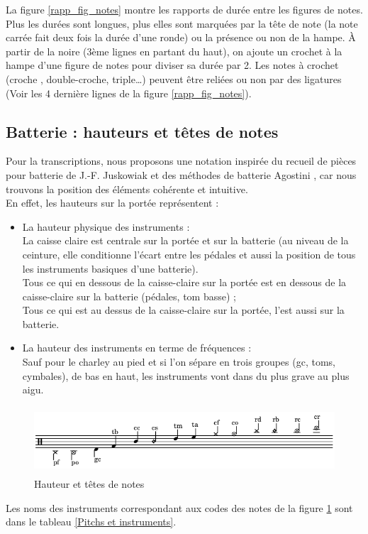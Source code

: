 La figure \ref{rapp_fig_notes} montre les rapports de durée entre les figures de notes. Plus les durées sont longues, plus elles sont marquées par la tête de note (la note carrée fait deux fois la durée d’une ronde) ou la présence ou non de la hampe. À partir de la noire (3ème lignes en partant du haut), on ajoute un crochet à la hampe d’une figure de notes pour diviser sa durée par 2. Les notes à crochet (croche , double-croche, triple…) peuvent être reliées ou non par des ligatures (Voir les 4 dernière lignes de la figure \ref{rapp_fig_notes}).
\subsection*{Batterie : hauteurs et têtes de notes}
Pour la transcriptions, nous proposons une notation inspirée du recueil de pièces pour batterie de J.-F. Juskowiak \cite{jusko} et des méthodes de batterie Agostini \cite{ago_meth_3}, car nous trouvons la position des éléments cohérente et intuitive.\\
En effet, les hauteurs sur la portée représentent :
\begin{itemize}
	\item La hauteur physique des instruments :\\
	La caisse claire est centrale sur la portée et sur la batterie (au niveau de la ceinture, elle conditionne l’écart entre les pédales et aussi la position de tous les instruments basiques d’une batterie).\\
	Tous ce qui en dessous de la caisse-claire sur la portée est en dessous de la caisse-claire sur la batterie (pédales, tom basse) ;\\
	Tous ce qui est au dessus de la caisse-claire sur la portée, l’est aussi sur la batterie.\\
	\item La hauteur des instruments en terme de fréquences :\\
	Sauf pour le charley au pied et si l’on sépare en trois groupes (gc, toms, cymbales), de bas en haut, les instruments vont dans du plus grave au plus aigu.
\end{itemize}
\begin{figure}[!h]
	\centering
	\includegraphics[height=25mm, width=130mm]{z_images/description_notation/notes.png}
	\caption{Hauteur et têtes de notes}
	\label{Hauteur et têtes de notes}
\end{figure}
Les noms des instruments correspondant aux codes des notes de la figure \ref{Hauteur et têtes de notes} sont dans le tableau \ref{Pitchs et instruments}.

